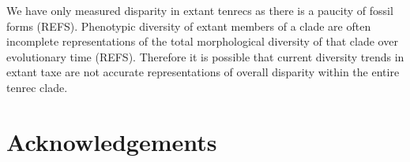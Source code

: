 \documentclass[12pt,a4paper]{article}
\begin{document}
We have only measured disparity in extant tenrecs as there is a paucity of fossil forms (REFS). Phenotypic diversity of extant members of a clade are often incomplete representations of the total morphological diversity of that clade over evolutionary time (REFS). Therefore it is possible that current diversity trends in extant taxe are not accurate representations of overall disparity within the entire tenrec clade. 








\section*{Acknowledgements}






\end{document}
